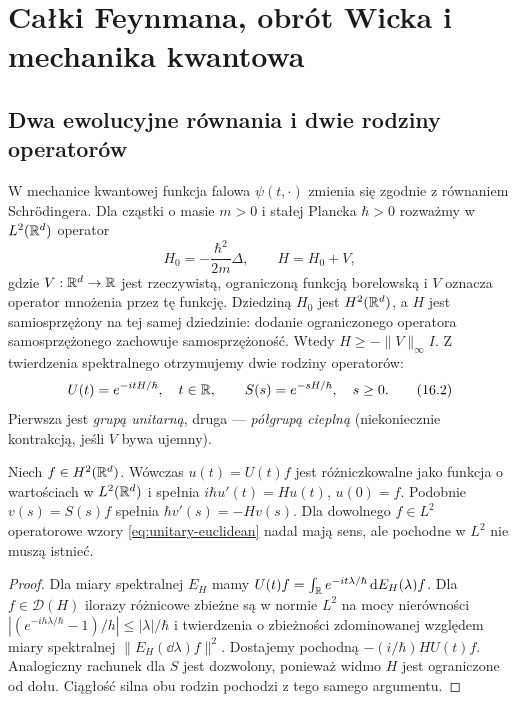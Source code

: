 \chapter{Całki Feynmana, obrót Wicka i mechanika kwantowa}
\label{ch:feynman-path}

\section{Dwa ewolucyjne równania i dwie rodziny operatorów}

W mechanice kwantowej funkcja falowa $\psi(t,\cdot)$ zmienia się
zgodnie z równaniem Schrödingera. Dla cząstki o masie $m>0$
i stałej Plancka $\hbar>0$ rozważmy w $L^2(\mathbb{R}^d)$
operator
\[
 H_0=-\frac{\hbar^2}{2m}\Delta,
 \qquad H=H_0+V,
\tag{16.1}\label{eq:QM-H}
\]
gdzie $V:\mathbb{R}^d\to\mathbb{R}$ jest rzeczywistą, ograniczoną funkcją
borelowską i $V$ oznacza operator mnożenia przez tę funkcję.
Dziedziną $H_0$ jest $H^2(\mathbb{R}^d)$, a $H$ jest
samiosprzężony na tej samej dziedzinie: dodanie ograniczonego
operatora samosprzężonego zachowuje samosprzężoność.
Wtedy $H\ge-\|V\|_\infty I$. Z twierdzenia spektralnego
otrzymujemy dwie rodziny operatorów:
\[
 U(t)=e^{-itH/\hbar},\quad t\in\mathbb{R},\qquad
 S(s)=e^{-sH/\hbar},\quad s\ge0.
\tag{16.2}\label{eq:unitary-euclidean}
\]
Pierwsza jest \emph{grupą unitarną}, druga --- \emph{półgrupą
cieplną} (niekoniecznie kontrakcją, jeśli $V$ bywa ujemny).

\begin{stwierdzenie}
\label{prop:unitary-generator}
Niech $f\in H^2(\mathbb{R}^d)$. Wówczas $u(t)=U(t)f$ jest
różniczkowalne jako funkcja o wartościach w $L^2(\mathbb{R}^d)$
i spełnia $i\hbar u'(t)=Hu(t)$, $u(0)=f$.
Podobnie $v(s)=S(s)f$ spełnia $\hbar v'(s)=-Hv(s)$.
Dla dowolnego $f\in L^2$ operatorowe wzory
\eqref{eq:unitary-euclidean} nadal mają sens, ale
pochodne w $L^2$ nie muszą istnieć.
\end{stwierdzenie}
\begin{proof}
Dla miary spektralnej $E_H$ mamy
$U(t)f=\int_{\mathbb{R}}e^{-it\lambda/\hbar}\,\mathrm{d} E_H(\lambda)f$.
Dla $f\in\mathcal D(H)$ ilorazy różnicowe zbieżne są
w normie $L^2$ na mocy nierówności
$|(e^{-ih\lambda/\hbar}-1)/h|\le|\lambda|/\hbar$
i twierdzenia o zbieżności zdominowanej względem
miary spektralnej $\|E_H(\dd\lambda)f\|^2$.
Dostajemy pochodną $-(i/\hbar)HU(t)f$.
Analogiczny rachunek dla $S$ jest dozwolony, ponieważ
widmo $H$ jest ograniczone od dołu. Ciągłość silna
obu rodzin pochodzi z tego samego argumentu.
\end{proof}

